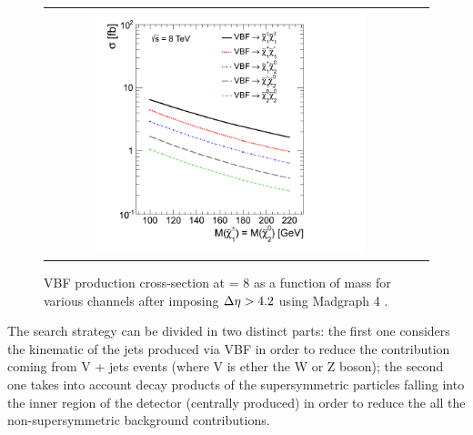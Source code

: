 \begin{figure}[tbh!]
	\centering
	\begin{tabular}{cc}
		\includegraphics[width=0.75\textwidth]{analysis/pics/VBFXsection.png}
	\end{tabular}
	\caption{VBF production cross-section at \CM = 8 \tev as a function of mass for various channels after imposing \ensuremath{\deltaeta > 4.2} using Madgraph 4 \cite{Dutta:2012xe}.}
	\label{fig:VBF_xsec}
\end{figure}

The search strategy can be divided in two distinct parts: the first one considers the kinematic of the jets produced via VBF in order to reduce the contribution coming  from V + jets events (where V is ether the W or Z boson); the second one takes into account decay products of the supersymmetric particles falling into the inner region of the detector (centrally produced) in order to reduce the all the non-supersymmetric background contributions.

